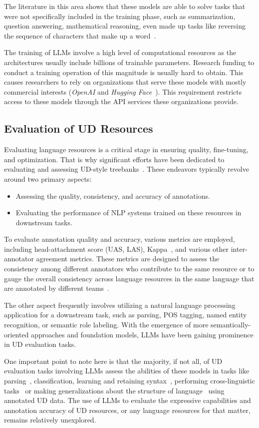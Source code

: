The literature in this area shows that these models are able to solve tasks that were not specifically included in the training phase, such as summarization, question answering, mathematical reasoning, even made up tasks like reversing the sequence of characters that make up a word~\cite{brown2020language}.

The training of LLMs involve a high level of computational resources as the architectures usually include billions of trainable parameters.  
Research funding to conduct a training operation of this magnitude is usually hard to obtain. 
This causes researchers to rely on organizations that serve these models with mostly commercial interests (\textit{OpenAI} and \textit{Hugging Face}~\cite{openai,huggingface}). This requirement restricts access to these models through the API services these organizations provide. 

\subsection{Evaluation of UD Resources}
Evaluating language resources is a critical stage in ensuring quality, fine-tuning, and optimization. That is why significant efforts have been dedicated to evaluating and assessing UD-style treebanks~\cite{nivre2017universal}. These endeavors typically revolve around two primary aspects:
\begin{itemize}
    \item Assessing the quality, consistency, and accuracy of annotations.
    \item Evaluating the performance of NLP systems trained on these resources in downstream tasks.
\end{itemize}

To evaluate annotation quality and accuracy, various metrics are employed, including head-attachment score (UAS, LAS), Kappa~\cite{mchugh2012interrater}, and various other inter-annotator agreement metrics.
These metrics are designed to assess the consistency among different annotators who contribute to the same resource or to gauge the overall consistency across language resources in the same language that are annotated by different teams~\cite{tyers2017assessment, grunewald2020unifying}. 

The other aspect frequently involves utilizing a natural language processing application for a downstream task, such as parsing, POS tagging, named entity recognition, or semantic role labeling.
With the emergence of more semantically-oriented approaches and foundation models, LLMs have been gaining prominence in UD evaluation tasks. 

One important point to note here is that the majority, if not all, of UD evaluation tasks involving LLMs assess the abilities of these models in tasks like parsing~\cite{al2023fine, kanerva2020dependency}, classification, learning and retaining syntax~\cite{kulmizev2020neural, limisiewicz2020universal}, performing cross-linguistic tasks~\cite{ahmad2019cross} or making generalizations about the structure of language~\cite{mccoy2019berts, yang2019exploring} using annotated UD data.
The use of LLMs to evaluate the expressive capabilities and annotation accuracy of UD resources, or any language resources for that matter, remains relatively unexplored.